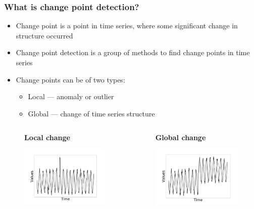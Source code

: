 \documentclass[intlimits, 9pt, unicode]{beamer}
\begin{document}
\begin{frame}
    \frametitle{What is change point detection?}

    \begin{itemize}
    	\item Change point is a point in time series, where some significant change in structure occurred
	\item Change point detection is a group of methods to find change points in time series
	\item Change points can be of two types:
		\begin{itemize}
			\item Local --- anomaly or outlier
			\item Global --- change of time series structure
		\end{itemize}
    \end{itemize}

    {\begin{columns}
        \begin{column}{5cm}
        \begin{figure}
        \centering
	\textbf{Local change}
        \includegraphics[height=3.5cm]{images/local_cp}
	\end{figure}
        \end{column}

        \begin{column}{5cm}
	\begin{figure}
    	\centering
	\textbf{Global change}
        \includegraphics[height=3.5cm]{images/global_cp}
	\end{figure}
        \end{column}
    \end{columns}}

\end{frame}
\end{document}
